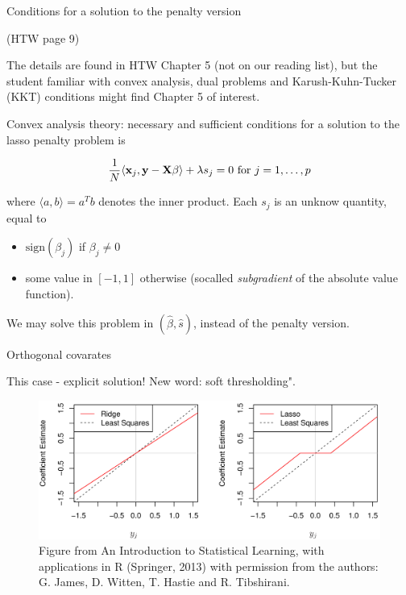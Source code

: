 \documentclass[
  ignorenonframetext,
]{beamer}
\providecommand{\tightlist}{%
  \setlength{\itemsep}{0pt}\setlength{\parskip}{0pt}}
\begin{document}
\begin{frame}

\begin{block}{Conditions for a solution to the penalty version}

(HTW page 9)

The details are found in HTW Chapter 5 (not on our reading list), but
the student familiar with convex analysis, dual problems and
Karush-Kuhn-Tucker (KKT) conditions might find Chapter 5 of interest.

Convex analysis theory: necessary and sufficient conditions for a
solution to the lasso penalty problem is

\[ \frac{1}{N}\langle {\bf x}_j,{\bf y}-{\bf X}\beta \rangle+\lambda s_j=0 \mbox{ for } j=1,\ldots,p\]

where \(\langle a,b \rangle=a^T b\) denotes the inner product. Each
\(s_j\) is an unknow quantity, equal to

\begin{itemize}
\tightlist
\item
  \(\text{sign}(\beta_j)\) if \(\beta_j\neq 0\)
\item
  some value in \([-1,1]\) otherwise (socalled \emph{subgradient} of the
  absolute value function).
\end{itemize}

We may solve this problem in \((\hat{\beta},\hat{s})\), instead of the
penalty version.

\end{block}

\end{frame}

\begin{frame}

\begin{block}{Orthogonal covarates}

This case - explicit solution! New word: soft thresholding".

\end{block}

\end{frame}

\begin{frame}

\begin{figure}
\includegraphics[width=0.5\linewidth]{./ILS610} \caption{Figure from An Introduction to Statistical Learning, with applications in R (Springer, 2013) with permission from the authors: G. James, D. Witten, T. Hastie and R. Tibshirani.}\label{fig:unnamed-chunk-12}
\end{figure}

\end{frame}
\end{document}
